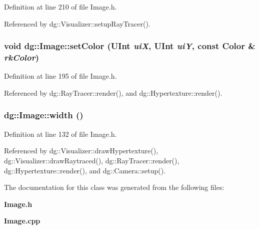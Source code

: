 Definition at line 210 of file Image.h.

Referenced by dg::Visualizer::setup\-Ray\-Tracer().
\subsubsection{\setlength{\rightskip}{0pt plus 5cm}void dg::Image::set\-Color ({\bf UInt} {\em ui\-X}, {\bf UInt} {\em ui\-Y}, const {\bf Color} \& {\em rk\-Color})\hspace{0.3cm}{\tt  [inline]}}\label{classdg_1_1Image_a19}




Definition at line 195 of file Image.h.

Referenced by dg::Ray\-Tracer::render(), and dg::Hypertexture::render().
\subsubsection{ dg::Image::width ()\hspace{0.3cm}{\tt  [inline]}}\label{classdg_1_1Image_a8}




Definition at line 132 of file Image.h.

Referenced by dg::Visualizer::draw\-Hypertexture(), dg::Visualizer::draw\-Raytraced(), dg::Ray\-Tracer::render(), dg::Hypertexture::render(), and dg::Camera::setup().

The documentation for this class was generated from the following files:\begin{CompactItemize}
\item 
{\bf Image.h}\item 
{\bf Image.cpp}\end{CompactItemize}
